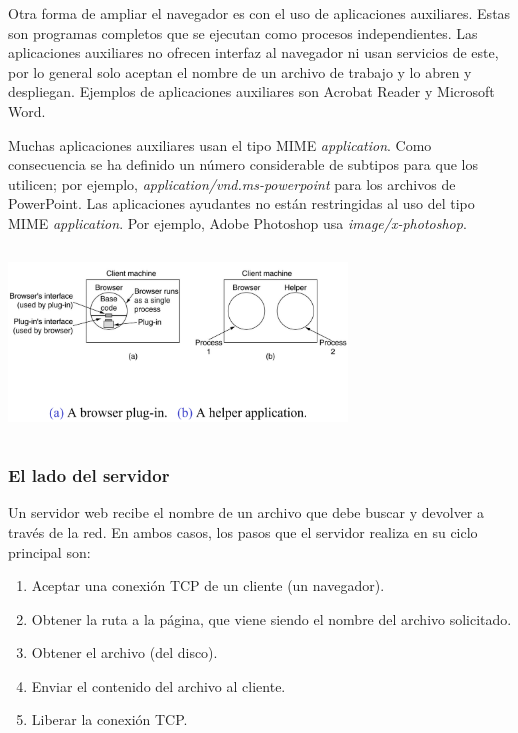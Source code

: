 \documentclass[10pt,a4paper]{report}
\begin{document}
				\par Otra forma de ampliar el navegador es con el uso de aplicaciones auxiliares. Estas son programas completos que se ejecutan como procesos
independientes. Las aplicaciones auxiliares no ofrecen interfaz al navegador ni usan servicios de este, por lo general solo aceptan el nombre de un archivo de trabajo y lo abren y despliegan. Ejemplos de aplicaciones auxiliares son Acrobat Reader y Microsoft Word.

				\par Muchas aplicaciones auxiliares usan el tipo MIME \textit{application}. Como consecuencia se ha definido un número considerable de subtipos para que los utilicen; por ejemplo, \textit{application/vnd.ms-powerpoint} para los archivos de PowerPoint. Las aplicaciones ayudantes no están restringidas al uso del tipo MIME \textit{application}. Por ejemplo, Adobe Photoshop usa \textit{image/x-photoshop}.
				
				\begin{center}
					\includegraphics[width=9cm, height=5cm]{./imagenes/plugin.png} 
				\end{center}
		
			\subsubsection{El lado del servidor}
			
				\par Un servidor web  recibe el nombre de un archivo que debe buscar y devolver a través de la red. En ambos casos, los pasos que el servidor realiza en su ciclo principal son:

				\begin{enumerate}
					\item Aceptar una conexión TCP de un cliente (un navegador).
					\item Obtener la ruta a la página, que viene siendo el nombre del archivo solicitado.
					\item Obtener el archivo (del disco).
					\item Enviar el contenido del archivo al cliente.
					\item Liberar la conexión TCP.
				\end{enumerate}	
\end{document}

